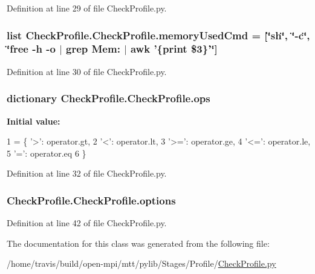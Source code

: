 Definition at line 29 of file Check\-Profile.\-py.

\hypertarget{class_check_profile_1_1_check_profile_a3c36cf35599b47c7158008533cc9cb39}{
\subsubsection[{memory\-Used\-Cmd}]{\setlength{\rightskip}{0pt plus 5cm}list Check\-Profile.\-Check\-Profile.\-memory\-Used\-Cmd = \mbox{[}\char`\"{}sh\char`\"{}, \char`\"{}-\/c\char`\"{}, \char`\"{}free -\/h -\/o $\vert$ grep Mem\-: $\vert$ awk '\{print \$3\}'\char`\"{}\mbox{]}\hspace{0.3cm}{\ttfamily [static]}}}\label{class_check_profile_1_1_check_profile_a3c36cf35599b47c7158008533cc9cb39}


Definition at line 30 of file Check\-Profile.\-py.

\hypertarget{class_check_profile_1_1_check_profile_aa4e92c1c6def969cc4a347111d4ef0de}{
\subsubsection[{ops}]{\setlength{\rightskip}{0pt plus 5cm}dictionary Check\-Profile.\-Check\-Profile.\-ops\hspace{0.3cm}{\ttfamily [static]}}}\label{class_check_profile_1_1_check_profile_aa4e92c1c6def969cc4a347111d4ef0de}
{\bfseries Initial value\-:}
\begin{DoxyCode}
1 = \{ \textcolor{stringliteral}{'>'}: operator.gt,
2             \textcolor{stringliteral}{'<'}: operator.lt,
3             \textcolor{stringliteral}{'>='}: operator.ge,
4             \textcolor{stringliteral}{'<='}: operator.le,
5             \textcolor{stringliteral}{'='}: operator.eq
6     \}
\end{DoxyCode}


Definition at line 32 of file Check\-Profile.\-py.

\hypertarget{class_check_profile_1_1_check_profile_a60bdbb946d15fb43c2e465bb8a3fff99}{
\subsubsection[{options}]{\setlength{\rightskip}{0pt plus 5cm}Check\-Profile.\-Check\-Profile.\-options}}\label{class_check_profile_1_1_check_profile_a60bdbb946d15fb43c2e465bb8a3fff99}


Definition at line 42 of file Check\-Profile.\-py.



The documentation for this class was generated from the following file\-:\begin{DoxyCompactItemize}
\item 
/home/travis/build/open-\/mpi/mtt/pylib/\-Stages/\-Profile/\hyperlink{_check_profile_8py}{Check\-Profile.\-py}\end{DoxyCompactItemize}
